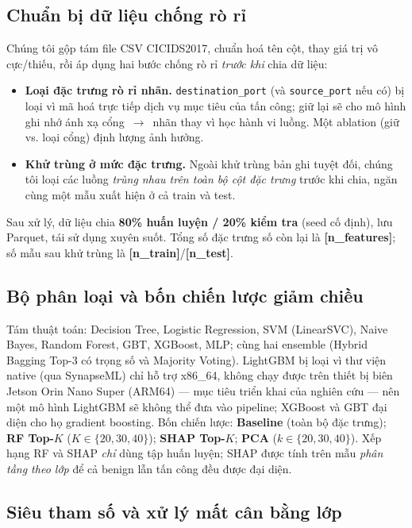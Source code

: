 \documentclass[runningheads]{llncs}
\newcommand{\ph}[1]{{\color{red}\textbf{[#1]}}}
\begin{document}
\subsection{Chuẩn bị dữ liệu chống rò rỉ}
\label{sec:leakage}

Chúng tôi gộp tám file CSV CICIDS2017, chuẩn hoá tên cột, thay giá trị vô cực/thiếu, rồi áp dụng hai bước chống rò rỉ \emph{trước khi} chia dữ liệu:

\begin{itemize}
  \item \textbf{Loại đặc trưng rò rỉ nhãn.} \texttt{destination\_port} (và \texttt{source\_port} nếu có) bị loại vì mã hoá trực tiếp dịch vụ mục tiêu của tấn công; giữ lại sẽ cho mô hình ghi nhớ ánh xạ cổng~$\rightarrow$~nhãn thay vì học hành vi luồng. Một ablation (giữ vs. loại cổng) định lượng ảnh hưởng.
  \item \textbf{Khử trùng ở mức đặc trưng.} Ngoài khử trùng bản ghi tuyệt đối, chúng tôi loại các luồng \emph{trùng nhau trên toàn bộ cột đặc trưng} trước khi chia, ngăn cùng một mẫu xuất hiện ở cả train và test.
\end{itemize}

Sau xử lý, dữ liệu chia \textbf{80\% huấn luyện / 20\% kiểm tra} (seed cố định), lưu Parquet, tái sử dụng xuyên suốt. Tổng số đặc trưng số còn lại là \ph{n\_features}; số mẫu sau khử trùng là \ph{n\_train}/\ph{n\_test}.

\subsection{Bộ phân loại và bốn chiến lược giảm chiều}

Tám thuật toán: Decision Tree, Logistic Regression, SVM (LinearSVC), Naive Bayes, Random Forest, GBT, XGBoost, MLP; cùng hai ensemble (Hybrid Bagging Top-3 có trọng số và Majority Voting). LightGBM bị loại vì thư viện native (qua SynapseML) chỉ hỗ trợ x86\_64, không chạy được trên thiết bị biên Jetson Orin Nano Super (ARM64) --- mục tiêu triển khai của nghiên cứu --- nên một mô hình LightGBM sẽ không thể đưa vào pipeline; XGBoost và GBT đại diện cho họ gradient boosting. Bốn chiến lược: \textbf{Baseline} (toàn bộ đặc trưng); \textbf{RF Top-$K$} ($K \in \{20,30,40\}$); \textbf{SHAP Top-$K$}; \textbf{PCA} ($k \in \{20,30,40\}$). Xếp hạng RF và SHAP \emph{chỉ} dùng tập huấn luyện; SHAP được tính trên mẫu \emph{phân tầng theo lớp} để cả benign lẫn tấn công đều được đại diện.

\subsection{Siêu tham số và xử lý mất cân bằng lớp}
\label{sec:hparams}
\end{document}
